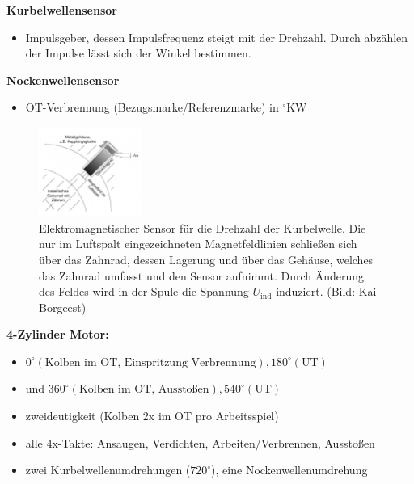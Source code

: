 \textbf{Kurbelwellensensor}

\begin{itemize}
\item
  Impulsgeber, dessen Impulsfrequenz steigt mit der Drehzahl. Durch
  abzählen der Impulse lässt sich der Winkel bestimmen.
\end{itemize}

\textbf{Nockenwellensensor}

\begin{itemize}
\item
  OT-Verbrennung (Bezugsmarke/Referenzmarke) in $^\circ \text{KW}$
\end{itemize}

\begin{figure}[!ht]%
\centering
\includegraphics[width=0.3\textwidth]{images/EDC/EDC-4.pdf}
\caption{Elektromagnetischer Sensor für die Drehzahl der Kurbelwelle.
Die nur im Luftspalt eingezeichneten Magnetfeldlinien schließen sich
über das Zahnrad, dessen Lagerung und über das Gehäuse, welches das
Zahnrad umfasst und den Sensor aufnimmt. Durch Änderung des Feldes wird
in der Spule die Spannung $U_{\text{ind}}$ induziert. (Bild: Kai
Borgeest)}
\end{figure}

\newpage

\textbf{4-Zylinder Motor:}

\begin{itemize}
\item
  $0^\circ (\text{Kolben im OT, Einspritzung Verbrennung}), 180^\circ (\text{UT})$
\item
  und
  $360^\circ (\text{Kolben im OT, Ausstoßen}), 540^\circ (\text{UT})$
\item
  zweideutigkeit (Kolben 2x im OT pro Arbeitsspiel)
\item
  alle 4x-Takte: Ansaugen, Verdichten, Arbeiten/Verbrennen, Ausstoßen
\item
  zwei Kurbelwellenumdrehungen ($720^\circ$), eine
  Nockenwellenumdrehung
\end{itemize}


